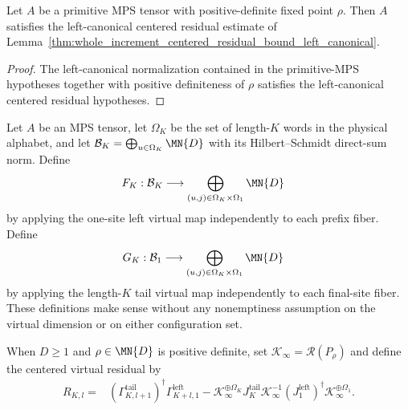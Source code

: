 \begin{lemma}
    \label{thm:primitive_whole_increment_centered_residual_bound}
    \leanok
    Let $A$ be a primitive MPS tensor with positive-definite fixed point
    $\rho$.  Then $A$ satisfies the left-canonical centered residual estimate
    of Lemma~\ref{thm:whole_increment_centered_residual_bound_left_canonical}.
\end{lemma}

\begin{proof}
    \leanok
    The left-canonical normalization contained in the primitive-MPS
    hypotheses together with positive definiteness of $\rho$ satisfies the
    left-canonical centered residual hypotheses.
\end{proof}

\begin{definition}
    \label{def:c3_centered_overlap_factors_residual}
    \leanok
    Let $A$ be an MPS tensor, let $\Omega_K$ be the set of length-$K$ words
    in the physical alphabet, and let
    $\mathcal B_K=\bigoplus_{u\in\Omega_K}\MN{D}$ with its
    Hilbert--Schmidt direct-sum norm.  Define
    \begin{align}
        F_K & :\mathcal B_K\longrightarrow
        \bigoplus_{(u,j)\in\Omega_K\times\Omega_1}\MN{D}
    \end{align}
    by applying the one-site left virtual map independently to each prefix
    fiber.  Define
    \begin{align}
        G_K & :\mathcal B_1\longrightarrow
        \bigoplus_{(u,j)\in\Omega_K\times\Omega_1}\MN{D}
    \end{align}
    by applying the length-$K$ tail virtual map independently to each
    final-site fiber.  These definitions make sense without any nonemptiness
    assumption on the virtual dimension or on either configuration set.

    When $D\geq1$ and $\rho\in\MN{D}$ is positive definite, set
    $\mathcal K_\infty=\mathscr R(P_\rho)$ and define the centered virtual
    residual by
    \begin{align}
        R_{K,l}={} & (\Gamma^{\mathrm{tail}}_{K,l+1})^\dagger
        \Gamma^{\mathrm{left}}_{K+l,1}
        -\mathcal K_\infty^{\oplus\Omega_K}J^{\mathrm{tail}}_K
        \mathcal K_\infty^{-1}(J^{\mathrm{left}}_1)^\dagger
        \mathcal K_\infty^{\oplus\Omega_1}.
    \end{align}
\end{definition}

